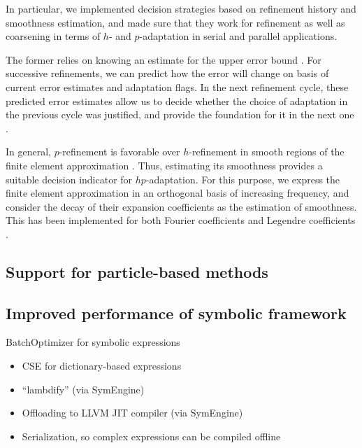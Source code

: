 \documentclass{ansarticle-preprint}
\begin{document}
In particular, we implemented decision strategies based on refinement history and
smoothness estimation, and made sure that they work for refinement as well as
coarsening in terms of $h$- and $p$-adaptation in serial and parallel applications.

The former relies on knowing an estimate for the upper error bound \cite[Thm.~3.4]{BabuskaSuri1990}.
For successive refinements, we can predict how the error will change on basis of
current error estimates and adaptation flags. In the next refinement cycle, these
predicted error estimates allow us to decide whether the choice of adaptation in
the previous cycle was justified, and provide the foundation for it in the next
one \cite{MelenkWohlmuth2001}.

In general, $p$-refinement is favorable over $h$-refinement in smooth regions of
the finite element approximation \cite[Thm.~3.4]{BabuskaSuri1990}. Thus, estimating
its smoothness provides a suitable decision indicator for $hp$-adaptation. For this
purpose, we express the finite element approximation in an orthogonal
basis of increasing frequency, and consider the decay of their expansion
coefficients as the estimation of smoothness. This has been implemented for both
Fourier coefficients \cite{BangerthKayserHerold2007} and Legendre coefficients
\cite{Mavriplis1994,HoustonSeniorSueli2003,HoustonSueli2005,EibnerMelenk2007}.


\subsection{Support for particle-based methods}
\label{subsec:particles}



\subsection{Improved performance of symbolic framework}
\label{subsec:symbdiff}


BatchOptimizer for symbolic expressions
\begin{itemize}
\item CSE for dictionary-based expressions
\item ``lambdify'' (via SymEngine)
\item Offloading to LLVM JIT compiler (via SymEngine)
\item Serialization, so complex expressions can be compiled offline
\end{itemize}
\end{document}
